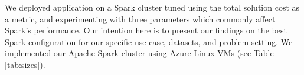 {%
We deployed \sparkdi{} application on a Spark cluster tuned using the total solution cost as a metric, and experimenting with three parameters which commonly affect Spark's performance. Our intention here is to present our findings on the best Spark configuration for our specific use case, datasets, and problem setting. We implemented our Apache Spark cluster using Azure Linux VMs (see Table \ref{tab:sizes}).

\begin{figure}[t!]
   \\
\end{figure}}
